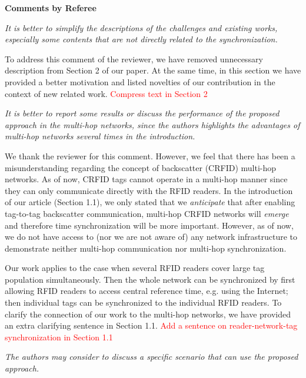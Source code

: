 \documentclass[10pt]{article}
\newcommand{\referee}[1]{
	{\item \color{OliveGreen} \emph{{#1}}}
	\label{R\therefereeCounter:\arabic{enumi}}
}
\newcommand{\response}[1]{{\color{blue} #1}}
\newcounter{refereeCounter}
\newenvironment{responses}{%
\refstepcounter{refereeCounter}%
\textbf{\large Comments by Referee \therefereeCounter}
\begin{enumerate}%
\renewcommand{\labelenumi}{\textbf{[R\therefereeCounter :\,\arabic{enumi}]}} %
}{\end{enumerate}}
\begin{document}
\begin{responses}

\referee{It is better to simplify the descriptions of the challenges and existing works, especially some contents that are not directly related to the synchronization.}
	
\response{To address this comment of the reviewer, we have removed unnecessary description from Section 2 of our paper. At the same time, in this section we have provided a better motivation and listed novelties of our contribution in the context of new related work. \textcolor{red}{Compress text in Section 2}}

\referee{It is better to report some results or discuss the performance of the proposed approach in the multi-hop networks, since the authors highlights the advantages of multi-hop networks several times in the introduction.}
	
\response{We thank the reviewer for this comment. However, we feel that there has been a misunderstanding regarding the concept of backscatter (CRFID) multi-hop networks. As of now, CRFID tags cannot operate in a multi-hop manner since they can only communicate directly with the RFID readers. In the introduction of our article (Section 1.1), we only stated that we \emph{anticipate} that after enabling tag-to-tag backscatter communication, multi-hop CRFID networks will \emph{emerge} and therefore time synchronization will be more important. However, as of now, we do not have access to (nor we are not aware of) any network infrastructure to demonstrate neither multi-hop communication nor multi-hop synchronization. 

Our work applies to the case when several RFID readers cover large tag population simultaneously. Then the whole network can be synchronized by first allowing RFID readers to access central reference time, e.g. using the Internet; then individual tags can be synchronized to the individual RFID readers. To clarify the connection of our work to the multi-hop networks, we have provided an extra clarifying sentence in Section 1.1. \textcolor{red}{Add a sentence on reader-network-tag synchronization in Section 1.1}}
	
\referee{The authors may consider to discuss a specific scenario that can use the proposed approach.}
	

\end{responses}
\end{document}
